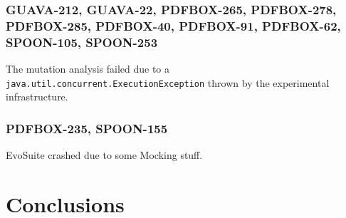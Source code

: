 \documentclass[sigconf]{acmart}
\newcommand{\EVOSUITE}{{\sc EvoSuite}\xspace}
\begin{document}
\subsubsection*{GUAVA-212, GUAVA-22, PDFBOX-265, PDFBOX-278, PDFBOX-285,
PDFBOX-40, PDFBOX-91, PDFBOX-62, SPOON-105, SPOON-253} The mutation analysis
failed due to a \texttt{java.util.concurrent.ExecutionException} thrown by the
experimental infrastructure.


\subsubsection*{PDFBOX-235, SPOON-155} \EVOSUITE crashed due to some Mocking stuff.


\section{Conclusions}



\end{document}

